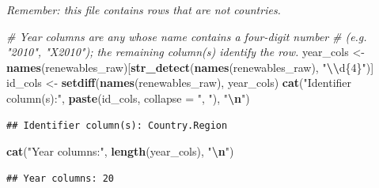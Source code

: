 \documentclass[
]{article}
\newenvironment{Shaded}{\begin{snugshade}}{\end{snugshade}}
\newcommand{\AttributeTok}[1]{\textcolor[rgb]{0.13,0.29,0.53}{#1}}
\newcommand{\CommentTok}[1]{\textcolor[rgb]{0.56,0.35,0.01}{\textit{#1}}}
\newcommand{\FunctionTok}[1]{\textcolor[rgb]{0.13,0.29,0.53}{\textbf{#1}}}
\newcommand{\NormalTok}[1]{#1}
\newcommand{\OtherTok}[1]{\textcolor[rgb]{0.56,0.35,0.01}{#1}}
\newcommand{\SpecialCharTok}[1]{\textcolor[rgb]{0.81,0.36,0.00}{\textbf{#1}}}
\newcommand{\StringTok}[1]{\textcolor[rgb]{0.31,0.60,0.02}{#1}}
\begin{document}
\emph{Remember: this file contains rows that are not countries.}

\begin{Shaded}
\begin{Highlighting}[]
\CommentTok{\# Year columns are any whose name contains a four{-}digit number}
\CommentTok{\# (e.g. "2010", "X2010"); the remaining column(s) identify the row.}
\NormalTok{year\_cols }\OtherTok{\textless{}{-}} \FunctionTok{names}\NormalTok{(renewables\_raw)[}\FunctionTok{str\_detect}\NormalTok{(}\FunctionTok{names}\NormalTok{(renewables\_raw),}
                                              \StringTok{"}\SpecialCharTok{\textbackslash{}\textbackslash{}}\StringTok{d\{4\}"}\NormalTok{)]}
\NormalTok{id\_cols }\OtherTok{\textless{}{-}} \FunctionTok{setdiff}\NormalTok{(}\FunctionTok{names}\NormalTok{(renewables\_raw), year\_cols)}
\FunctionTok{cat}\NormalTok{(}\StringTok{"Identifier column(s):"}\NormalTok{, }\FunctionTok{paste}\NormalTok{(id\_cols, }\AttributeTok{collapse =} \StringTok{", "}\NormalTok{), }\StringTok{"}\SpecialCharTok{\textbackslash{}n}\StringTok{"}\NormalTok{)}
\end{Highlighting}
\end{Shaded}

\begin{verbatim}
## Identifier column(s): Country.Region
\end{verbatim}

\begin{Shaded}
\begin{Highlighting}[]
\FunctionTok{cat}\NormalTok{(}\StringTok{"Year columns:"}\NormalTok{, }\FunctionTok{length}\NormalTok{(year\_cols), }\StringTok{"}\SpecialCharTok{\textbackslash{}n}\StringTok{"}\NormalTok{)}
\end{Highlighting}
\end{Shaded}

\begin{verbatim}
## Year columns: 20
\end{verbatim}
\end{document}
